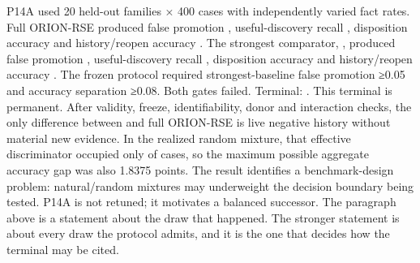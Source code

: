 \markdownRendererDocumentBegin
\markdownRendererSectionBegin
{}\markdownRendererInterblockSeparator
{}P14A used 20 held-out families × 400 cases with independently varied fact rates. Full ORION-RSE produced false promotion , useful-discovery recall , disposition accuracy  and history/reopen accuracy .\markdownRendererInterblockSeparator
{}The strongest comparator, , produced false promotion , useful-discovery recall , disposition accuracy  and history/reopen accuracy .\markdownRendererInterblockSeparator
{}The frozen protocol required strongest-baseline false promotion ≥0.05 and accuracy separation ≥0.08. Both gates failed. Terminal: . This terminal is permanent.\markdownRendererInterblockSeparator
{}\markdownRendererSectionBegin
{}\markdownRendererInterblockSeparator
{}After validity, freeze, identifiability, donor and interaction checks, the only difference between  and full ORION-RSE is live negative history without material new evidence. In the realized random mixture, that effective discriminator occupied only \markdownRendererStrongEmphasis{1.8375\markdownRendererPercentSign{}} of cases, so the maximum possible aggregate accuracy gap was also 1.8375 points. The result identifies a benchmark-design problem: natural/random mixtures may underweight the decision boundary being tested. P14A is not retuned; it motivates a balanced successor.\markdownRendererInterblockSeparator
{}
\markdownRendererSectionEnd \markdownRendererSectionBegin
{}\markdownRendererInterblockSeparator
{}The paragraph above is a statement about the draw that happened. The stronger statement is about every draw the protocol admits, and it is the one that decides how the terminal may be cited.\markdownRendererInterblockSeparator
